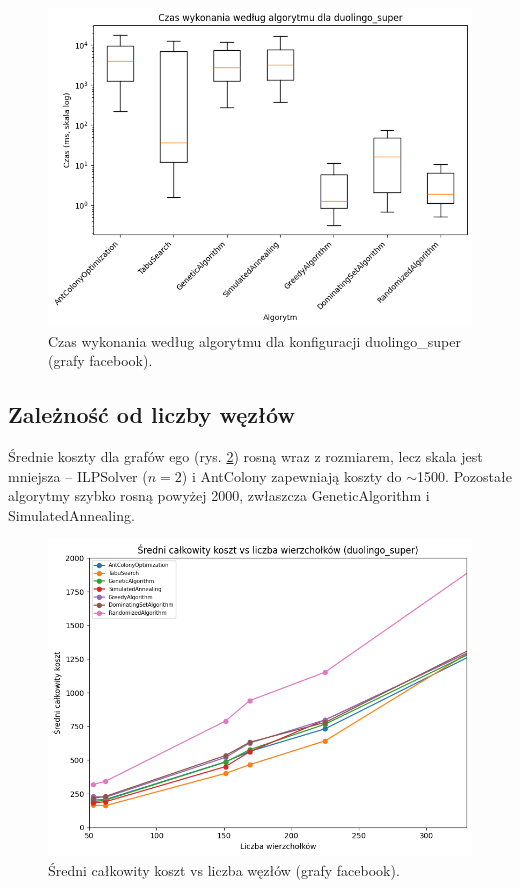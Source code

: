 \begin{figure}[H]
  \centering
  \includegraphics[width=0.7\linewidth]{assets/figures/facebook_time_boxplot.png}
  \caption{Czas wykonania według algorytmu dla konfiguracji duolingo\_super (grafy facebook).}
  \label{fig:facebook_time_boxplot}
\end{figure}

\subsection{Zależność od liczby węzłów}

Średnie koszty dla grafów ego (rys. \ref{fig:facebook_cost_vs_nodes}) rosną wraz z rozmiarem, lecz skala jest mniejsza -- ILPSolver ($n = 2$) i AntColony zapewniają koszty do $\sim$1500. Pozostałe algorytmy szybko rosną powyżej 2000, zwłaszcza GeneticAlgorithm i SimulatedAnnealing.

\begin{figure}[H]
  \centering
  \includegraphics[width=0.7\linewidth]{assets/figures/facebook_cost_vs_nodes.png}
  \caption{Średni całkowity koszt vs liczba węzłów (grafy facebook).}
  \label{fig:facebook_cost_vs_nodes}
\end{figure}

